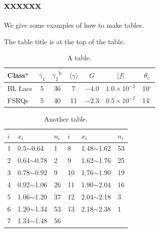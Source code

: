 \documentclass{article}
\begin{document}
\subsection{xxxxxx}

We give some examples of how to make tables.

The table title is at the top of the table.

\begin{table}[htbp]	
	\centering
	\caption{A table.}
	\begin{tabular}[l]{@{}lcccccc}		
		\toprule		
		Class$^{\rm a}$ & $\gamma_1$ & $\gamma_2$$^{\rm b}$& $\langle \gamma \rangle$& $G$ & $|{ f}|$ & $\theta _{c}$ \\		
		\midrule	
		BL Lacs &5 & 36 & 7 & $-4.0$ & $1.0\times 10^{-2}$ & 10$^\circ$ \\		
		FSRQs & 5 & 40 & 11 & $-2.3$ & $0.5\times 10^{-2}$ & 14$^\circ$ \\		
		\bottomrule		
	\end{tabular}
	\label{tab:t1}
\end{table}

\begin{table}[htbp]  
\caption{Another table.}  
\begin{center}  
\begin{tabu} to 0.8\textwidth{X[c]|X[3,b]|X[2,l]|X[c]|X[3,m]|X[1,c]}  
\hline  
$i$  &$x_i$              &$n_i$      &$i$    &$x_i$               &$n_i$\\  
    &0.5$\sim$0.64       &1           &8    &1.48$\sim$1.62      &53\\  
2    &0.64$\sim$0.78      &2           &9    &1.62$\sim$1.76      &25\\  
3    &0.78$\sim$0.92      &9           &10   &1.76$\sim$1.90      &19\\  
4    &0.92$\sim$1.06      &26          &11   &1.90$\sim$2.04      &16\\  
5    &1.06$\sim$1.20      &37          &12   &2.04$\sim$2.18      &3\\  
6    &1.20$\sim$1.34      &53          &13   &2.18$\sim$2.38      &1\\  
7    &1.34$\sim$1.48      &56          &     &                    & \\  
\hline  
\end{tabu}  
\end{center}  
\end{table}
\end{document}
